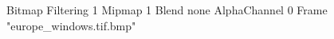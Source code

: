 {Bitmap
	{Filtering 1}
	{Mipmap 1}
	{Blend none}
	{AlphaChannel 0}
	{Frame "europe_windows.tif.bmp"}
}
